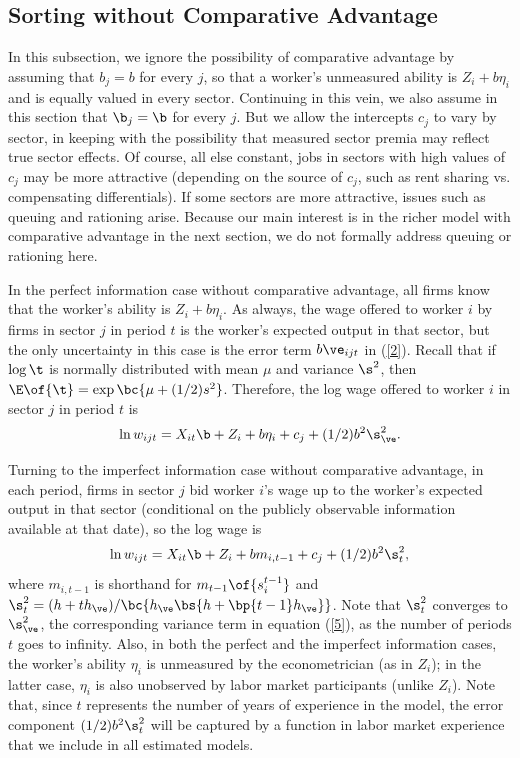 \documentclass[12pt]{article}
\theoremstyle{definition}
\begin{document}
\subsection{Sorting without Comparative Advantage}

In this subsection, we ignore the possibility of comparative advantage by assuming that $b_j = b$ for every $j$, so that a worker's unmeasured ability is $Z_i + b \eta_i$ and is equally valued in every sector. Continuing in this vein, we also assume in this section that $\b_j = \b$ for every $j$. But we allow the intercepts $c_j$ to vary by sector, in keeping with the possibility that measured sector premia may reflect true sector effects. Of course, all else constant, jobs in sectors with high values of $c_j$ may be more attractive (depending on the source of $c_j$, such as rent sharing vs. compensating differentials). If some sectors are more attractive, issues such as queuing and rationing arise. Because our main interest is in the richer model with comparative advantage in the next section, we do not formally address queuing or rationing here. 

In the perfect information case without comparative advantage, all firms know that the worker's ability is $Z_i + b \eta_i$. As always, the wage offered to worker $i$ by firms in sector $j$ in period $t$ is the worker's expected output in that sector, but the only uncertainty in this case is the error term $b \ve_{ijt}$ in (\ref{2}). Recall that if $\log \t$ is normally distributed with mean $\mu$ and variance $\s^2$, then $\E\of{\t} = \exp\bc{\mu + (1/2)s^2}$. Therefore, the log wage offered to worker $i$ in sector $j$ in period $t$ is 
\begin{equation}
    \label{5}
    \ln w_{ijt} = X_{it} \b + Z_i + b \eta_i + c_j + (1/2) b^2 \s_\ve^2.
\end{equation}

Turning to the imperfect information case without comparative advantage, in each period, firms in sector $j$ bid worker $i$'s wage up to the worker's expected output in that sector (conditional on the publicly observable information available at that date), so the log wage is 
\begin{equation}
    \label{6}
    \ln w_{ijt} = X_{it} \b + Z_i + b m_{i, t-1} + c_j + (1/2) b^2 \s_t^2 ,
\end{equation}
where $m_{i, t-1}$ is shorthand for $m_{t-1}\of{s_i^{t-1}}$ and $\s_t^2 = (h + t h_\ve)/\bc{h_\ve\bs{h + \bp{t-1}h_\ve}}$. Note that $\s_t^2$ converges to $\s_\ve^2$, the corresponding variance term in equation (\ref{5}), as the number of periods $t$ goes to infinity. Also, in both the perfect and the imperfect information cases, the worker's ability $\eta_i$ is unmeasured by the econometrician (as in $Z_i$); in the latter case, $\eta_i$ is also unobserved by labor market participants (unlike $Z_i$). Note that, since $t$ represents the number of years of experience in the model, the error component $(1/2) b^2 \s_t^2$ will be captured by a function in labor market experience that we include in all estimated models. 
\end{document}
